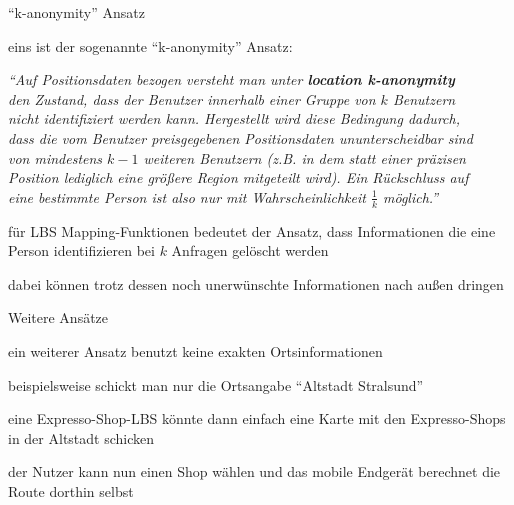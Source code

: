 \begin{frame}{"`k-anonymity"' Ansatz}
\itemize
\item eins ist der sogenannte "`k-anonymity"' Ansatz: \\ \vspace{.1cm}
  \begin{small}
	\hspace{-1.2cm} \textit{"`Auf Positionsdaten bezogen versteht man unter \textbf{location k-anonymity}\\
	\hspace{-1.2cm} den Zustand, dass der Benutzer innerhalb einer Gruppe von $k$ Benutzern\\
	\hspace{-1.2cm} nicht identifiziert werden kann. Hergestellt wird diese Bedingung dadurch,\\
	\hspace{-1.2cm} dass die vom Benutzer preisgegebenen Positionsdaten ununterscheidbar sind\\
	\hspace{-1.2cm} von mindestens $k - 1$ weiteren  Benutzern (z.B. in dem statt einer präzisen\\
	\hspace{-1.2cm} Position lediglich eine größere Region mitgeteilt wird). Ein Rückschluss auf\\
	\hspace{-1.2cm} eine bestimmte Person ist also nur mit Wahrscheinlichkeit $\frac{1}{k}$ möglich."'}
  \end{small}
\item für LBS Mapping-Funktionen bedeutet der Ansatz, dass Informationen die eine Person identifizieren bei $k$ Anfragen gelöscht werden
\item dabei können trotz dessen noch unerwünschte Informationen nach außen dringen
\enditemize
\end{frame}

\begin{frame}{Weitere Ansätze}
\itemize
\item ein weiterer Ansatz benutzt keine exakten Ortsinformationen
\item beispielsweise schickt man nur die Ortsangabe "`Altstadt Stralsund"'
\item eine Expresso-Shop-LBS könnte dann einfach eine Karte mit den Expresso-Shops in der Altstadt schicken
\item der Nutzer kann nun einen Shop wählen und das mobile Endgerät berechnet die Route dorthin selbst
\enditemize
\end{frame}

